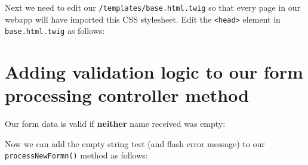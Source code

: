 \documentclass[a4paperpaper,openright]{book}
\newenvironment{Shaded}{}{}
\newcommand{\DataTypeTok}[1]{\textcolor[rgb]{0.56,0.13,0.00}{#1}}
\newcommand{\ImportTok}[1]{#1}
\newcommand{\KeywordTok}[1]{\textcolor[rgb]{0.00,0.44,0.13}{\textbf{#1}}}
\newcommand{\NormalTok}[1]{#1}
\newcommand{\OperatorTok}[1]{\textcolor[rgb]{0.40,0.40,0.40}{#1}}
\newcommand{\OtherTok}[1]{\textcolor[rgb]{0.00,0.44,0.13}{#1}}
\newcommand{\StringTok}[1]{\textcolor[rgb]{0.25,0.44,0.63}{#1}}
\begin{document}
Next we need to edit our \texttt{/templates/base.html.twig} so that
every page in our webapp will have imported this CSS stylesheet. Edit
the \texttt{\textless{}head\textgreater{}} element in
\texttt{base.html.twig} as follows:

\begin{Shaded}
\end{Shaded}

\hypertarget{adding-validation-logic-to-our-form-processing-controller-method}{%
\section{Adding validation logic to our form processing controller
method}\label{adding-validation-logic-to-our-form-processing-controller-method}}

Our form data is valid if \textbf{neither} name received was empty:

\begin{Shaded}
\end{Shaded}

Now we can add the empty string test (and flash error message) to our
\texttt{processNewFormn()} method as follows:
\end{document}
